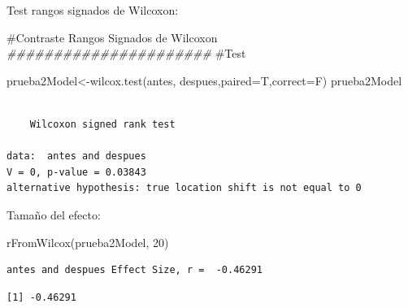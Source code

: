 \documentclass[
  ignorenonframetext,
]{beamer}
\newenvironment{Shaded}{\begin{snugshade}}{\end{snugshade}}
\newcommand{\AttributeTok}[1]{\textcolor[rgb]{0.40,0.45,0.13}{#1}}
\newcommand{\CommentTok}[1]{\textcolor[rgb]{0.37,0.37,0.37}{#1}}
\newcommand{\DecValTok}[1]{\textcolor[rgb]{0.68,0.00,0.00}{#1}}
\newcommand{\DocumentationTok}[1]{\textcolor[rgb]{0.37,0.37,0.37}{\textit{#1}}}
\newcommand{\FunctionTok}[1]{\textcolor[rgb]{0.28,0.35,0.67}{#1}}
\newcommand{\NormalTok}[1]{\textcolor[rgb]{0.00,0.23,0.31}{#1}}
\newcommand{\OtherTok}[1]{\textcolor[rgb]{0.00,0.23,0.31}{#1}}
\newcommand{\SpecialCharTok}[1]{\textcolor[rgb]{0.37,0.37,0.37}{#1}}
\begin{document}
\begin{frame}[fragile]
\begin{block}{Test rangos signados de Wilcoxon:}
\label{test-rangos-signados-de-wilcoxon}
\begin{Shaded}
\begin{Highlighting}[]
\CommentTok{\#Contraste Rangos Signados de Wilcoxon}
\DocumentationTok{\#\#\#\#\#\#\#\#\#\#\#\#\#\#\#\#\#\#\#\#\#\#}
\CommentTok{\#Test}

\NormalTok{prueba2Model}\OtherTok{\textless{}{-}}\FunctionTok{wilcox.test}\NormalTok{(antes, despues,}\AttributeTok{paired=}\NormalTok{T,}\AttributeTok{correct=}\NormalTok{F)}
\NormalTok{prueba2Model}
\end{Highlighting}
\end{Shaded}

\begin{verbatim}

    Wilcoxon signed rank test

data:  antes and despues
V = 0, p-value = 0.03843
alternative hypothesis: true location shift is not equal to 0
\end{verbatim}

\begin{Shaded}
\end{Shaded}
\end{block}
\end{frame}

\begin{frame}[fragile]
\begin{block}{Tamaño del efecto:}
\label{tamauxf1o-del-efecto-1}
\begin{Shaded}
\begin{Highlighting}[]
\FunctionTok{rFromWilcox}\NormalTok{(prueba2Model, }\DecValTok{20}\NormalTok{)}
\end{Highlighting}
\end{Shaded}

\begin{verbatim}
antes and despues Effect Size, r =  -0.46291
\end{verbatim}

\begin{verbatim}
[1] -0.46291
\end{verbatim}
\end{block}
\end{frame}
\end{document}
